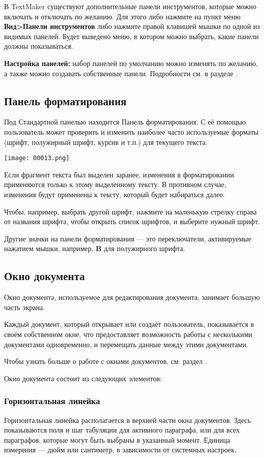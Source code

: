 ﻿\documentclass[a4paper,10pt]{article}
\begin{document}
В TextMaker существуют дополнительные панели инструментов, которые можно включать и отключать по желанию. Для этого либо нажмите на пункт меню \textbf{Вид>Панели инструментов} либо нажмите правой клавишей мышки по одной из видимых панелей. Будет выведено меню, в котором можно выбрать, какие панели должны показываться.

\textbf{Настройка панелей:} набор панелей по умолчанию можно изменять по желанию, а также можно создавать собственные панели. Подробности см. в разделе .

\subsection{Панель форматирования}
Под Стандартной панелью находится Панель форматирования. С её помощью пользователь может проверить и изменить наиболее часто используемые форматы (шрифт, полужирный шрифт, курсив и т.п.) для текущего текста.

\texttt{[image: 00013.png]}

Если фрагмент текста был выделен заранее, изменения в форматировании применяются только к этому выделенному тексту. В противном случае, изменения будут применены к тексту, который будет набираться далее.

Чтобы, например, выбрать другой шрифт, нажмите на маленькую стрелку справа от названия шрифта, чтобы открыть список шрифтов, и выберите нужный шрифт.

Другие значки на панели форматирования — это переключатели, активируемые нажатием мышки, например, \textbf{B} для полужирного шрифта.

\subsection{Окно документа}
Окно документа, используемое для редактирования документа, занимает большую часть экрана.

Каждый документ, который открывает или создаёт пользователь, показывается в своём собственном окне, что предоставляет возможность работы с несколькими документами одновременно, и перемещать данные между этими документами.

Чтобы узнать больше о работе с окнами документов, см. раздел .

Окно документа состоит из следующих элементов:

\subsubsection{Горизонтальная линейка}
Горизонтальная линейка располагается в верхней части окна документов. Здесь показываются поля и шаг табуляции для активного параграфа, или для всех параграфов, которые могут быть выбраны в указанный момент. Единица измерения — дюйм или сантиметр, в зависимости от системных настроек.
\end{document}
